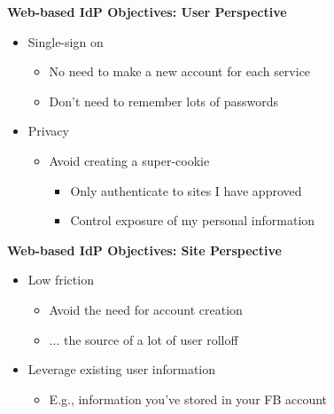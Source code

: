 \documentclass[helvetica]{seminar}
\newcommand{\heading}[1]{%
  \begin{center} 
    \large\bf 
    #1 
  \end{center} 
  \vspace{.4 in}}
\begin{document}
\begin{slide}
\heading{Web-based IdP Objectives: User Perspective}

\begin{itemize}
\item Single-sign on
  \begin{itemize}
  \item No need to make a new account for each service
  \item Don't need to remember lots of passwords
  \end{itemize}

\item Privacy
  \begin{itemize}
  \item Avoid creating a super-cookie
    \begin{itemize}
    \item Only authenticate to sites I have approved
    \item Control exposure of my personal information
    \end{itemize}
  \end{itemize}
\end{itemize}
\end{slide}


\begin{slide}
\heading{Web-based IdP Objectives: Site Perspective}

\begin{itemize}
\item Low friction
  \begin{itemize}
  \item Avoid the need for account creation
  \item ... the source of a lot of user rolloff
  \end{itemize}

\item Leverage existing user information
  \begin{itemize}
  \item E.g., information you've stored in your FB account
  \end{itemize}
\end{itemize}
\end{slide}
\end{document}
